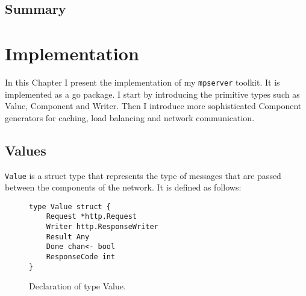 \documentclass[12pt,a4paper]{article}
\begin{document}
\subsection{Summary}


\newpage
\section{Implementation}
\label{sec:impl}
In this Chapter I present the implementation of my \texttt{mpserver} toolkit.
It is implemented as a go package. I start by introducing the primitive 
types such as Value, Component and Writer. Then I introduce more
sophisticated Component generators for caching, load balancing and 
network communication.

\subsection{Values}
\texttt{Value} is a struct type that represents the type of messages that are
passed between the components of the network. It is defined as follows:

\begin{figure}[h]
\centering
\begin{lstlisting}
type Value struct {
    Request *http.Request
    Writer http.ResponseWriter
    Result Any
    Done chan<- bool
    ResponseCode int
}
\end{lstlisting}
\caption[scale=1.0]{Declaration of type Value.}
\label{fig:Value}
\end{figure}
\end{document}
